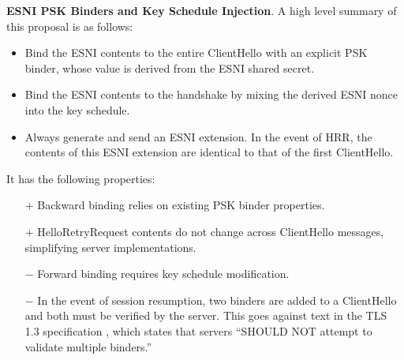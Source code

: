 \documentclass{article}
\theoremstyle{definition}
\begin{document}
\textbf{ESNI PSK Binders and Key Schedule Injection}. A high level summary of this proposal is as follows:
%
\begin{itemize}
  \item Bind the ESNI contents to the entire ClientHello with an explicit PSK binder, whose value is
  derived from the ESNI shared secret.
  \item Bind the ESNI contents to the handshake by mixing the derived ESNI nonce into the key schedule.
  \item Always generate and send an ESNI extension. In the event of HRR, the contents of this ESNI 
  extension are identical to that of the first ClientHello.
\end{itemize}
%
It has the following properties:
%
\begin{itemize}
  \item[$+$] Backward binding relies on existing PSK binder properties.
  \item[$+$] HelloRetryRequest contents do not change across ClientHello messages, simplifying server
  implementations.
  \item[$-$] Forward binding requires key schedule modification.
  \item[$-$] In the event of session resumption, two binders are added to a ClientHello and both
  must be verified by the server. This goes against text in the TLS 1.3 specification \cite{rfc8446}, 
  which states that servers ``SHOULD NOT attempt to validate multiple binders.''
\end{itemize}
%



\end{document}

